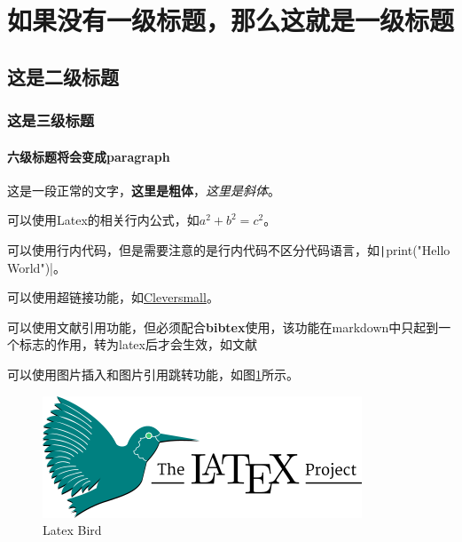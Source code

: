 \section{如果没有一级标题，那么这就是一级标题}

\subsection{这是二级标题}

\subsubsection{这是三级标题}

\paragraph{六级标题将会变成paragraph}

\par 这是一段正常的文字，\textbf{这里是粗体}，\textit{这里是斜体}。

\par 可以使用Latex的相关行内公式，如$a^2+b^2=c^2$。

\par 可以使用行内代码，但是需要注意的是行内代码不区分代码语言，如\texttt|print("Hello World")|。

\par 可以使用超链接功能，如\href{https://www.cleversmall.com}{Cleversmall}。

\par 可以使用文献引用功能，但必须配合\textbf{bibtex}使用，该功能在markdown中只起到一个标志的作用，转为latex后才会生效，如文献\cite{name2024paper}

\par 可以使用图片插入和图片引用跳转功能，如图\ref{fig1}所示。

\begin{figure}[ht]
    \centering
    \includegraphics[width=\textwidth]{./figure/latex_bird.png}
    \caption{Latex Bird}
    \label{fig1}
\end{figure}

